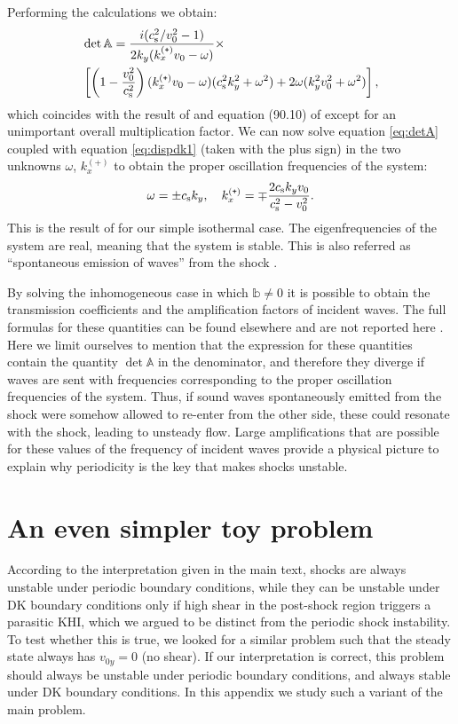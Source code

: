 \documentclass[useAMS,usenatbib]{mn2e}
\def\Plus{\texttt{+}}
\begin{document}
Performing the calculations we obtain:
%
\begin{align}
& \det \mathbb{A} = \frac{i (\cs^2/v_0^2 - 1)}{2 k_y (k_x^{(\Plus)} v_0 - \omega)} \times \nonumber\\
& \left[ 
\left( 1 - \frac{v_0^2}{\cs^2} \right) (k_x^{(\Plus)} v_0 - \omega) ( \cs^2 k_y^2 + \omega^2) + 2 \omega ( k_y^2 v_0^2 + \omega^2)
\right], 
\end{align}
which coincides with the result of \cite{Dyakov54} and equation (90.10) of \cite{landau} except for an unimportant overall multiplication factor. We can now solve equation \eqref{eq:detA} coupled with equation \eqref{eq:dispdk1} (taken with the plus sign) in the two unknowns $\omega$, $k_x^{(\Plus)}$ to obtain the proper oscillation frequencies of the system:
\begin{equation}
\omega = \pm \cs k_y, \quad k_x^{(\Plus)} = \mp \frac{2 \cs k_y v_0}{\cs^2 - v_0^2}. \label{eq:resultDK}
\end{equation}
This is the result of \cite{Dyakov54} for our simple isothermal case. The eigenfrequencies of the system are real, meaning that the system is stable. This is also referred as ``spontaneous emission of waves'' from the shock \citep{landau}.

By solving the inhomogeneous case in which $\mathbb{b}\neq 0$ it is possible to obtain the transmission coefficients and the amplification factors of incident waves. The full formulas for these quantities can be found elsewhere and are not reported here \citep{Dyakov58a,Dyakov58b,Kontorovich58b,McKenzieWestphal1968}. Here we limit ourselves to mention that the expression for these quantities contain the quantity $\det \mathbb{A}$ in the denominator, and therefore they diverge if waves are sent with frequencies corresponding to the proper oscillation frequencies of the system. Thus, if sound waves spontaneously emitted from the shock were somehow allowed to re-enter from the other side, these could resonate with the shock, leading to unsteady flow. Large amplifications that are possible for these values of the frequency of incident waves provide a physical picture to explain why periodicity is the key that makes shocks unstable. 


\section{An even simpler toy problem} \label{appendix:toy}

According to the interpretation given in the main text, shocks are always unstable under periodic boundary conditions, while they can be unstable under DK boundary conditions only if high shear in the post-shock region triggers a parasitic KHI, which we argued to be distinct from the periodic shock instability. To test whether this is true, we looked for a similar problem such that the steady state always has $v_{0y}=0$ (no shear). If our interpretation is correct, this problem should always be unstable under periodic boundary conditions, and always stable under DK boundary conditions. In this appendix we study such a variant of the main problem.
\end{document}

